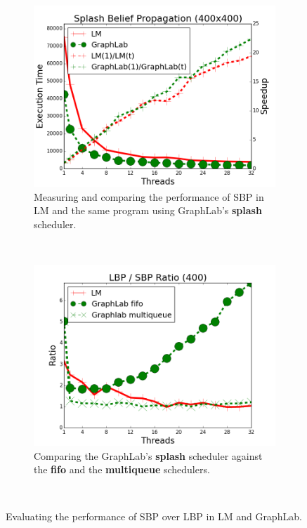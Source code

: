 \begin{figure}[]
        \centering
        \begin{subfigure}[b]{\plotsize\textwidth}
        \includegraphics[width=\textwidth]{experiments/threads/cmp-splash-bp-400.png}
        \caption{Measuring and comparing the performance of SBP in LM and
           the same program using GraphLab's \textbf{splash} scheduler.}
           \label{fig:threads:results_splash_final}
        \end{subfigure}~ ~
        \begin{subfigure}[b]{\plotsize\textwidth}
           \includegraphics[width=\textwidth]{experiments/threads/cmp-ratio-belief-propagation-400.png}
           \caption{Comparing the GraphLab's \textbf{splash}
           scheduler against the \textbf{fifo} and the \textbf{multiqueue}
        schedulers.}
           \label{fig:threads:splash_ratio_fifo}
        \end{subfigure}\\
        \caption{Evaluating the performance of SBP over LBP in LM and GraphLab.}
        \label{fig:threads:results_splash_ratio}
\end{figure}
